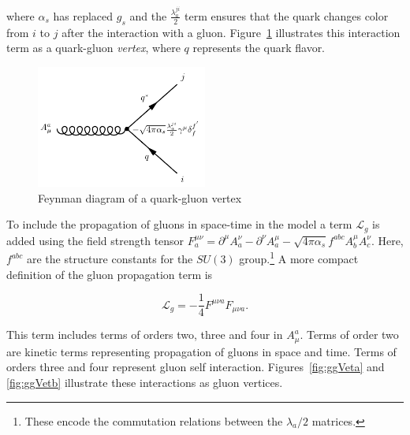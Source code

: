 where $\alpha_s$ has replaced $g_s$ and the $\frac{\lambda^{ji}_a}{2}$ term ensures that the quark changes 
color from $i$ to $j$ after the interaction with a gluon. Figure~\ref{fig:qgVet} illustrates this interaction 
term as a quark-gluon {\it vertex}, where $q$ represents the quark flavor.   

\begin{figure}[!h]
\centering
   \includegraphics[width=0.5\textwidth]{figures/gq.pdf}
\caption{Feynman diagram of a quark-gluon vertex}
\label{fig:qgVet}
\end{figure}

To include the propagation of gluons in space-time in the model 
a term  $\mathcal{L}_g$ is added using the field strength 
tensor $F^{\mu\nu}_a = \partial^\mu A^\nu_a - \partial^\nu A^\mu_a - \sqrt{4\pi\alpha_s}f^{abc}A^\mu_bA^\nu_c$. 
Here, $f^{abc}$ are the structure constants for the $SU(3)$ group.\footnote{These encode the commutation relations 
between the $\lambda_a/2$ matrices.} A more compact definition of the gluon propagation term is 

\begin{equation}
\mathcal{L}_g = -\frac{1}{4}F^{\mu\nu a}F_{\mu\nu a}.
\end{equation}

This term includes terms of orders two, three and four in $A_\mu^a$. Terms of order two are 
kinetic terms representing propagation of gluons in space and time. Terms of orders three and 
four represent gluon self interaction. Figures~\ref{fig:ggVeta} and \ref{fig:ggVetb} illustrate 
these interactions as gluon vertices.  

